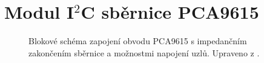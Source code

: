 \section{Modul I$^2$C sběrnice PCA9615}
\label{app:module-i2c-sbernice-pca9615}


\begin{figure}[H]
    \centering
    \def\svgwidth{\columnwidth}
    
    \caption[Blokové schéma zapojení obvodu PCA9615.]{Blokové schéma zapojení obvodu PCA9615 s impedančním zakončením sběrnice a možnostmi napojení uzlů. Upraveno z \cite{pca9615-schema-zapojeni}.}
    \label{fig:blokove-schema-pca9615-i2c-sbernice}
\end{figure}
